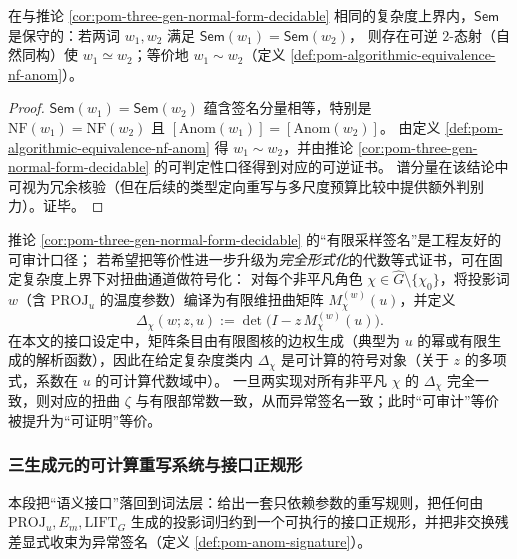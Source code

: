 \begin{theorem}\label{thm:pom-sem-conservative-on-slice}
在与推论 \ref{cor:pom-three-gen-normal-form-decidable} 相同的复杂度上界内，\(\mathsf{Sem}\) 是保守的：若两词 \(w_1,w_2\) 满足
\(
\mathsf{Sem}(w_1)=\mathsf{Sem}(w_2)
\)，
则存在可逆 \(2\)-态射（自然同构）使 \(w_1\simeq w_2\)；等价地 \(w_1\sim w_2\)（定义 \ref{def:pom-algorithmic-equivalence-nf-anom}）。
\end{theorem}

\begin{proof}
\(\mathsf{Sem}(w_1)=\mathsf{Sem}(w_2)\) 蕴含签名分量相等，特别是 \(\mathrm{NF}(w_1)=\mathrm{NF}(w_2)\) 且 \([\mathrm{Anom}(w_1)]=[\mathrm{Anom}(w_2)]\)。
由定义 \ref{def:pom-algorithmic-equivalence-nf-anom} 得 \(w_1\sim w_2\)，并由推论 \ref{cor:pom-three-gen-normal-form-decidable} 的可判定性口径得到对应的可逆证书。
谱分量在该结论中可视为冗余核验（但在后续的类型定向重写与多尺度预算比较中提供额外判别力）。证毕。
\end{proof}

\begin{remark}\label{rem:pom-anom-symbolic-certificate}
推论 \ref{cor:pom-three-gen-normal-form-decidable} 的“有限采样签名”是工程友好的可审计口径；
若希望把等价性进一步升级为\emph{完全形式化}的代数等式证书，可在固定复杂度上界下对扭曲通道做符号化：
对每个非平凡角色 \(\chi\in\widehat G\setminus\{\chi_0\}\)，将投影词 \(w\)（含 \(\mathrm{PROJ}_u\) 的温度参数）编译为有限维扭曲矩阵 \(M_{\chi}^{(w)}(u)\)，并定义
\[
\Delta_\chi(w;z,u):=\det\bigl(I-z\,M_{\chi}^{(w)}(u)\bigr).
\]
在本文的接口设定中，矩阵条目由有限图核的边权生成（典型为 \(u\) 的幂或有限生成的解析函数），因此在给定复杂度类内 \(\Delta_\chi\) 是可计算的符号对象（关于 \(z\) 的多项式，系数在 \(u\) 的可计算代数域中）。
一旦两实现对所有非平凡 \(\chi\) 的 \(\Delta_\chi\) 完全一致，则对应的扭曲 \(\zeta\) 与有限部常数一致，从而异常签名一致；此时“可审计”等价被提升为“可证明”等价。
\end{remark}

\subsubsection{三生成元的可计算重写系统与接口正规形}\label{subsec:pom-three-gen-rewrite-normal}

本段把“语义接口”落回到词法层：给出一套只依赖参数的重写规则，把任何由
\(\mathrm{PROJ}_u,E_m,\mathrm{LIFT}_G\)
生成的投影词归约到一个可执行的接口正规形，并把非交换残差显式收束为异常签名（定义 \ref{def:pom-anom-signature}）。

